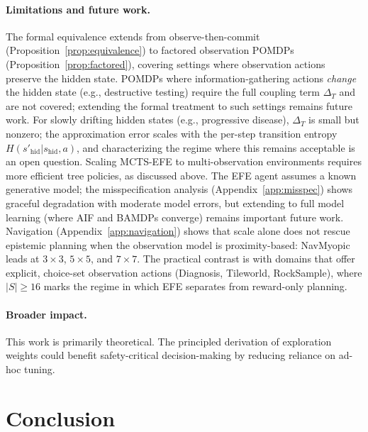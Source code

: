 \documentclass{article}
\begin{document}
\paragraph{Limitations and future work.}
The formal equivalence extends from observe-then-commit (Proposition~\ref{prop:equivalence}) to factored observation POMDPs (Proposition~\ref{prop:factored}), covering settings where observation actions preserve the hidden state. POMDPs where information-gathering actions \emph{change} the hidden state (e.g., destructive testing) require the full coupling term $\Delta_T$ and are not covered; extending the formal treatment to such settings remains future work. For slowly drifting hidden states (e.g., progressive disease), $\Delta_T$ is small but nonzero; the approximation error scales with the per-step transition entropy $H(s'_{\mathrm{hid}} | s_{\mathrm{hid}}, a)$, and characterizing the regime where this remains acceptable is an open question. Scaling MCTS-EFE to multi-observation environments requires more efficient tree policies, as discussed above. The EFE agent assumes a known generative model; the misspecification analysis (Appendix~\ref{app:misspec}) shows graceful degradation with moderate model errors, but extending to full model learning (where AIF and BAMDPs converge) remains important future work. Navigation (Appendix~\ref{app:navigation}) shows that scale alone does not rescue epistemic planning when the observation model is proximity-based: NavMyopic leads at $3{\times}3$, $5{\times}5$, and $7{\times}7$. The practical contrast is with domains that offer explicit, choice-set observation actions (Diagnosis, Tileworld, RockSample), where $|S| \geq 16$ marks the regime in which EFE separates from reward-only planning.

\paragraph{Broader impact.}
This work is primarily theoretical. The principled derivation of exploration weights could benefit safety-critical decision-making by reducing reliance on ad-hoc tuning.

\section{Conclusion}
\end{document}
